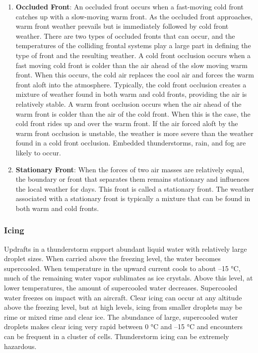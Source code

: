 \documentclass[12pt]{article}
\begin{document}
\begin{enumerate}
				\item \textbf{Occluded Front}: An occluded front occurs when a fast-moving cold front catches up with a slow-moving warm front. As the occluded front approaches, warm front weather prevails but is immediately followed by cold front weather. There are two types of occluded fronts that can occur, and the temperatures of the colliding frontal systems play a large part in defining the type of front and the resulting weather. A cold front occlusion occurs when a fast moving cold front is colder than the air ahead of the slow moving warm front. When this occurs, the cold air replaces the cool air and forces the warm front aloft into the atmosphere. Typically, the cold front occlusion creates a mixture of weather found in both warm and cold fronts, providing the air is relatively stable. A warm front occlusion occurs when the air ahead of the warm front is colder than the air of the cold front. When this is the case, the cold front rides up and over the warm front. If the air forced aloft by the warm front occlusion is unstable, the weather is more severe than the weather found in a cold front occlusion. Embedded thunderstorms, rain, and fog are likely to occur.
				\item \textbf{Stationary Front}: When the forces of two air masses are relatively equal, the boundary or front that separates them remains stationary and influences the local weather for days. This front is called a stationary front. The weather associated with a stationary front is typically a mixture that can be found in both warm and cold fronts.
			\end{enumerate}
		\subsubsection{Icing}
			Updrafts in a thunderstorm support abundant liquid water with relatively large droplet sizes. When carried above the freezing level, the water becomes supercooled. When temperature in the upward current cools to about –15 °C, much of the remaining water vapor sublimates as ice crystals. Above this level, at lower temperatures, the amount of supercooled water decreases. Supercooled water freezes on impact with an aircraft. Clear icing can occur at any altitude above the freezing level, but at high levels, icing from smaller droplets may be rime or mixed rime and clear ice. The abundance of large, supercooled water droplets makes clear icing very rapid between 0 °C and –15 °C and encounters can be frequent in a cluster of cells. Thunderstorm icing can be extremely hazardous.
\newpage
\end{document}
